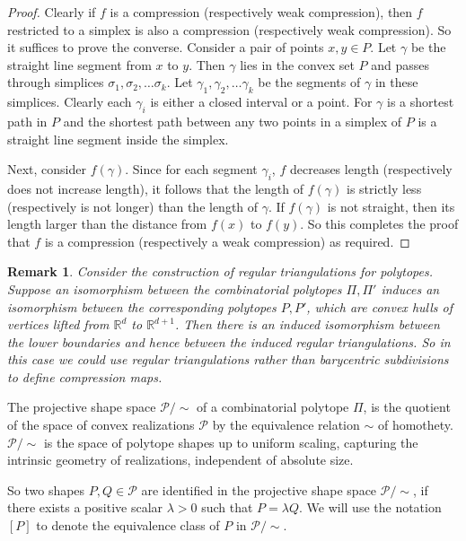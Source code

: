 \documentclass[a4paper, 12pt]{amsart}
\theoremstyle{plain}
\newtheorem{Rem}[Thm]{Remark}
\begin{document}
\begin{proof}
Clearly if $f$ is a compression (respectively weak compression), then $f$ restricted to a simplex is also a compression (respectively weak compression). So it suffices to prove the converse. Consider a pair of points $x,y \in P$. Let $\gamma$ be the straight line segment from $x$ to $y$. Then $\gamma$ lies in the convex set $P$ and passes through simplices $\sigma_1, \sigma_2, \dots \sigma_k$. Let $\gamma_1, \gamma_2, \dots \gamma_k$ be the segments of $\gamma$ in these simplices. Clearly each $\gamma_i$ is either a closed interval or a point. For $\gamma$ is a shortest path in $P$ and the shortest path between any two points in a simplex of $P$ is a straight line segment inside the simplex. 

Next, consider $f(\gamma)$. Since for each segment $\gamma_i$, $f$ decreases length (respectively does not increase length), it follows that the length of $f(\gamma)$ is strictly less (respectively is not longer) than the length of $\gamma$. If $f(\gamma)$ is not straight, then its length larger than the distance from $f(x)$ to $f(y)$. So this completes the proof that $f$ is a compression (respectively a weak compression) as required. 

\end{proof}

\begin{Rem} Consider the construction of regular triangulations for polytopes. Suppose an isomorphism between the combinatorial polytopes $\Pi, \Pi'$ induces an isomorphism between the corresponding polytopes $P,P'$, which are convex hulls of vertices lifted from $\mathbb{R}^d$ to $\mathbb{R}^{d+1}$. Then there is an induced isomorphism between the lower boundaries and hence between the induced regular triangulations. So in this case we could use regular triangulations rather than barycentric subdivisions to define compression maps. 
\end{Rem}

The projective shape space $\mathcal{P} / \sim$ of a combinatorial polytope $\Pi$, is the quotient of the space of convex realizations $\mathcal{P}$ by the equivalence relation $\sim$ of homothety. $\mathcal{P} / \sim$ is the space of polytope shapes up to uniform scaling, capturing the intrinsic geometry of realizations, independent of absolute size.

So two shapes $P, Q \in \mathcal{P}$ are identified in the projective shape space $\mathcal{P} / \sim$, if there exists a positive scalar $\lambda > 0$ such that $P = \lambda Q$.
We will use the notation $[P]$ to denote the equivalence class of $P$ in $\mathcal{P} / \sim$.
\end{document}

